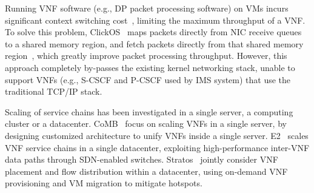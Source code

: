 
Running VNF software (e.g., DP packet processing software) on VMs incurs significant context switching cost~\cite{rizzo2013speeding}, limiting the maximum throughput of a VNF. To solve this problem, ClickOS~\cite{martins2014clickos} maps packets directly from NIC receive queues to a shared memory region, and fetch packets directly from that shared memory region~\cite{dpdk}, which greatly improve packet processing throughput. However, this approach completely by-passes the existing kernel networking stack, unable to support VNFs (e.g., S-CSCF and P-CSCF used by IMS system) that use the traditional TCP/IP stack. %

Scaling of service chains has been investigated in a single server, a computing cluster or a datacenter. CoMB~\cite{sekar2012design} focus on scaling VNFs in a single server, %
 by designing customized architecture to unify VNFs inside a single server. %
 E2~\cite{palkar2015e2} scales VNF service chains in a single datacenter, %
 exploiting high-performance inter-VNF data paths through SDN-enabled switches. %
Stratos~\cite{gember2012stratos} %
 jointly consider VNF placement and flow distribution within a datacenter, using on-demand VNF provisioning and VM migration to mitigate hotspots.

